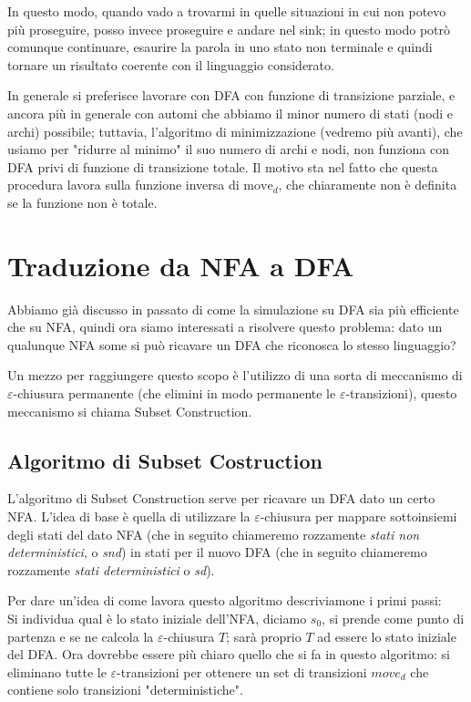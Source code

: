 \documentclass[class=book, crop=false, oneside, 12pt]{standalone}
\begin{document}
In questo modo, quando vado a trovarmi in quelle situazioni in cui non potevo più proseguire, posso invece proseguire e andare nel sink; in questo modo potrò comunque continuare, esaurire la parola in uno stato non terminale e quindi tornare un risultato coerente con il linguaggio considerato.

In generale si preferisce lavorare con DFA con funzione di transizione parziale, e ancora più in generale con automi che abbiamo il minor numero di stati (nodi e archi) possibile; tuttavia, l'algoritmo di minimizzazione (vedremo più avanti), che usiamo per "ridurre al minimo" il suo numero di archi e nodi, non funziona con DFA privi di funzione di transizione totale. Il motivo sta nel fatto che questa procedura lavora sulla funzione inversa di \(\textrm{move}_d\), che chiaramente non è definita se la funzione non è totale.


\section{Traduzione da NFA a DFA}
Abbiamo già discusso in passato di come la simulazione su DFA sia più efficiente che su NFA, quindi ora siamo interessati a risolvere questo problema: dato un qualunque NFA some si può ricavare un DFA che riconosca lo stesso linguaggio?

Un mezzo per raggiungere questo scopo è l’utilizzo di una sorta di meccanismo di \(\varepsilon\)-chiusura permanente (che elimini in modo permanente le \(\varepsilon\)-transizioni), questo meccanismo si chiama Subset Construction.


\subsection{Algoritmo di Subset Costruction}
L’algoritmo di Subset Construction serve per ricavare un DFA dato un certo NFA.
L'idea di base è quella di utilizzare la \(\varepsilon\)-chiusura per mappare sottoinsiemi degli stati del dato NFA (che in seguito chiameremo rozzamente \emph{stati non deterministici}, o \emph{snd}) in stati per il nuovo DFA (che in seguito chiameremo rozzamente \emph{stati deterministici} o \emph{sd}).

Per dare un'idea di come lavora questo algoritmo descriviamone i primi passi:\\
Si individua qual è lo stato iniziale dell'NFA, diciamo \(s_0\), si prende come punto di partenza e se ne calcola la \(\varepsilon\)-chiusura \(T\); sarà proprio \(T\) ad essere lo stato iniziale del DFA. Ora dovrebbe essere più chiaro quello che si fa in questo algoritmo: si eliminano tutte le \(\varepsilon\)-transizioni per ottenere un set di transizioni \(move_d\) che contiene solo transizioni "deterministiche".
\end{document}
